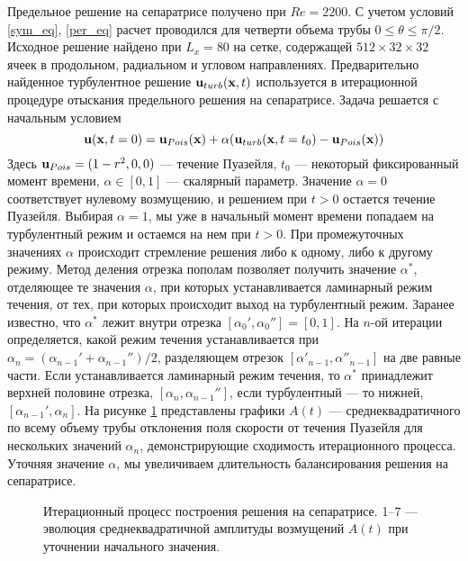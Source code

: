 Предельное решение на сепаратрисе получено при $Re=2200$. С учетом условий \eqref{sym_eq}, \eqref{per_eq} расчет проводился для четверти объема трубы $0\leqslant\theta\leqslant\pi/2$. Исходное решение найдено при $L_x = 80$ на сетке, содержащей $512 \times 32 \times  32$ ячеек в продольном, радиальном и угловом направлениях. Предварительно найденное турбулентное решение $\mathbf{u}_{turb}(\mathbf{x},t)$ используется в итерационной процедуре отыскания предельного решения на сепаратрисе. Задача решается с начальным условием
\begin{equation} \label{edge_init_eq}
\mathbf{u}(\mathbf{x},t=0) = \mathbf{u}_{Pois}(\mathbf{x})+\alpha(\mathbf{u}_{turb}(\mathbf{x},t=t_0) - \mathbf{u}_{Pois}(\mathbf{x}))
\end{equation}
Здесь $\mathbf{u}_{Pois}=(1-r^2,0,0)$ --- течение Пуазейля, $t_0$ --- некоторый фиксированный момент времени, $\alpha \in [0,1]$ --- скалярный параметр. Значение $\alpha=0$ соответствует нулевому возмущению, и решением при $t>0$ остается течение Пуазейля. Выбирая $\alpha=1$, мы уже в начальный момент времени попадаем на турбулентный режим и остаемся на нем при $t>0$. При промежуточных значениях $\alpha$ происходит стремление решения либо к одному, либо к другому режиму. Метод деления отрезка пополам позволяет получить значение $\alpha^*$, отделяющее те значения $\alpha$, при которых устанавливается ламинарный режим течения, от тех, при которых происходит выход на турбулентный режим. Заранее известно, что $\alpha^*$ лежит внутри отрезка $[\alpha_0', \alpha_0''] = [0,1]$. На $n$-ой итерации определяется, какой режим течения устанавливается при $\alpha_{n} = (\alpha_{n-1}' + \alpha_{n-1}'') / 2$, разделяющем отрезок $[\alpha'_{n-1}, \alpha''_{n-1}]$ на две равные части. Если устанавливается ламинарный режим течения, то $\alpha^*$ принадлежит верхней половине отрезка, $[\alpha_{n}, \alpha_{n-1}'']$, если турбулентный --- то нижней, $[\alpha_{n-1}', \alpha_{n}]$. На рисунке \ref{bisection_pic} представлены графики $A(t)$ --- среднеквадратичного по всему объему трубы отклонения поля скорости от течения Пуазейля для нескольких значений $\alpha_n$, демонстрирующие сходимость итерационного процесса. Уточняя значение $\alpha$, мы увеличиваем длительность балансирования решения на сепаратрисе. 


\begin{figure}[h]
\caption{Итерационный процесс построения решения на сепаратрисе. 1--7 --- эволюция среднеквадратичной амплитуды возмущений $A(t)$ при уточнении начального
значения.}
\label{bisection_pic}
\end{figure}

